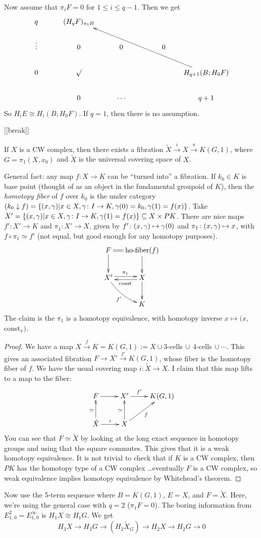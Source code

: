 Now assume that $\pi_i F=0$ for $1\le i\le q-1$. Then we get
\[\xymatrix @!0 @R+1pc @C+3pc{
 q & (H_q F)_{\pi_1 B}\\
 \vdots & 0 & 0 & 0\\
 0 & \surd & & &  H_{q+1}(B;H_0F) \ar[uulll]\\
 & 0 & \cdots & &  q+1
}\]
So $H_i E\cong H_i(B; H_0 F)$. If $q=1$, then there is no assumption.

[[break]]

\begin{lemma}
 If $X$ is a CW complex, then there exists a fibration $\tilde X\xrightarrow i X\xrightarrow\pi K(G,1)$, where $G=\pi_1(X,x_0)$ and $\tilde X$ is the universal covering space of $X$.
\end{lemma}
General fact: any map $f\colon X\to K$ can be ``turned into'' a fibration. If $k_0\in K$ is base point (thought of as an object in the fundamental groupoid of $K$), then the \emph{homotopy fiber} of $f$ over $k_0$ is the under category $(k_0\downarrow f)=\{(x,\gamma)|x\in X, \gamma\colon I\to K, \gamma(0)=k_0, \gamma(1)=f(x)\}$. Take $X'= \{(x,\gamma)|x\in X,\gamma\colon I\to K, \gamma(1)=f(x)\}\subseteq X\times P K$. There are nice maps $f'\colon X'\to K$ and $\pi_1\colon X'\to X$, given by $f'\colon (x,\gamma)\mapsto \gamma(0)$ and $\pi_1\colon (x,\gamma)\mapsto x$, with $f\circ \pi_1\simeq f'$ (not equal, but good enough for any homotopy purposes).
\[\xymatrix @C-1pc{
 F\ar@{=}[r]\ar[d] & \text{ho-fiber}(f)\ar[d]\\
 X'\ar@<.5ex>[r]^{\pi_1} \ar@/_/[dr]_{f'} & X\ar[d] \ar@<.5ex>[l]^{\text{const}}\\
 & K
}\]
The claim is the $\pi_1$ is a homotopy equivalence, with homotopy inverse $x\mapsto (x,$const$_x)$.
\begin{proof}
 We have a map $X\xrightarrow f K= K(G,1):= X\cup 3$-cells$\,\cup\, 4$-cells$\,\cup \cdots$. This gives an associated fibration $F\to X'\xrightarrow{f'} K(G,1)$, whose fiber is the homotopy fiber of $f$. We have the usual covering map $i\colon \tilde X\to X$. I claim that this map lifts to a map to the fiber:
 \[\xymatrix{
  F \ar[r] & X' \ar[r]^-{f'} & K(G,1)\\
  \tilde X\ar[u]^{\simeq} \ar[r]^i & X\ar[ru]_f \ar[u]^{\simeq}
 }\]
 You can see that $F\simeq \tilde X$ by looking at the long exact sequence in homotopy groups and using that the square commutes. This gives that it is a weak homotopy equivalence. It is not trivial to check that if $K$ is a CW complex, then $PK$ has the homotopy type of a CW complex \dots eventually $F$ is a CW complex, so weak equivalence implies homotopy equivalence by Whitehead's theorem.
\end{proof}
Now use the 5-term sequence where $B=K(G,1)$, $E=X$, and $F=\tilde X$. Here, we're using the general case with $q=2$ ($\pi_1 F=0$). The boring information from $E^2_{1,0}=E^\infty_{1,0}$ is $H_1 X\cong H_1 G$. We get
\[
 H_3 X\to H_3 G\to (H_2 \tilde X_G)\to H_2 X\to H_2 G\to 0
\]






